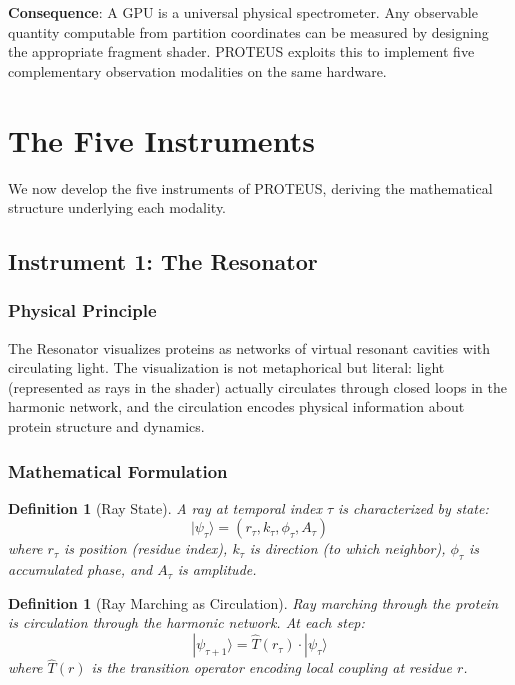 \documentclass[11pt,a4paper]{article}
\newtheorem{definition}[theorem]{Definition}
\begin{document}
\textbf{Consequence}: A GPU is a universal physical spectrometer. Any observable quantity computable from partition coordinates can be measured by designing the appropriate fragment shader. PROTEUS exploits this to implement five complementary observation modalities on the same hardware.

\section{The Five Instruments}

We now develop the five instruments of PROTEUS, deriving the mathematical structure underlying each modality.

\subsection{Instrument 1: The Resonator}

\subsubsection{Physical Principle}

The Resonator visualizes proteins as networks of virtual resonant cavities with circulating light. The visualization is not metaphorical but literal: light (represented as rays in the shader) actually circulates through closed loops in the harmonic network, and the circulation encodes physical information about protein structure and dynamics.

\subsubsection{Mathematical Formulation}

\begin{definition}[Ray State]
A ray at temporal index $\tau$ is characterized by state:
\begin{equation}
|\psi_\tau\rangle = (r_\tau, k_\tau, \phi_\tau, A_\tau)
\end{equation}
where $r_\tau$ is position (residue index), $k_\tau$ is direction (to which neighbor), $\phi_\tau$ is accumulated phase, and $A_\tau$ is amplitude.
\end{definition}

\begin{definition}[Ray Marching as Circulation]
Ray marching through the protein is circulation through the harmonic network. At each step:
\begin{equation}
|\psi_{\tau+1}\rangle = \hat{T}(r_\tau) \cdot |\psi_\tau\rangle
\end{equation}
where $\hat{T}(r)$ is the transition operator encoding local coupling at residue $r$.
\end{definition}
\end{document}
